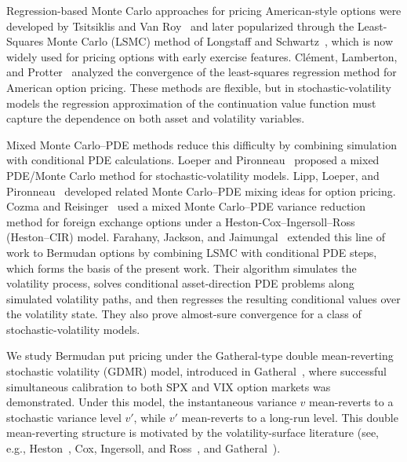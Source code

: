 \documentclass[pdflatex,sn-mathphys-num]{sn-jnl}
\theoremstyle{thmstyleone}%
\theoremstyle{thmstylethree}%
\theoremstyle{thmstyletwo}%
\begin{document}
Regression-based Monte Carlo approaches for pricing American-style options were developed by Tsitsiklis and Van Roy~\cite{tsitsiklis2001regression} and later popularized through the Least-Squares Monte Carlo (LSMC) method of Longstaff and Schwartz~\cite{longstaff2001valuing}, which is now widely used for pricing options with early exercise features.
Clément, Lamberton, and Protter~\cite{clement2002analysis} analyzed the
convergence of the least-squares regression method for American option pricing.
These methods are flexible, but in stochastic-volatility models the regression approximation of the continuation value function must capture the dependence on both asset and
volatility variables.

Mixed Monte Carlo--PDE methods reduce this difficulty by combining simulation
with conditional PDE calculations. Loeper and Pironneau~\cite{loeper2009mixed}
proposed a mixed PDE/Monte Carlo method for stochastic-volatility models.
Lipp, Loeper, and Pironneau~\cite{lipp2013mixing} developed related
Monte Carlo--PDE mixing ideas for option pricing. Cozma and
Reisinger~\cite{cozma2017mixed} used a mixed Monte Carlo--PDE variance
reduction method for foreign exchange options under a Heston-Cox--Ingersoll--Ross (Heston--CIR) model.
Farahany, Jackson, and Jaimungal~\cite{farahany2020mixing} extended this
line of work to Bermudan options by combining LSMC with conditional PDE
steps, which forms the basis of the present work. Their algorithm simulates the volatility process, solves conditional
asset-direction PDE problems along simulated volatility paths, and then
regresses the resulting conditional values over the volatility state. They also
prove almost-sure convergence for a class of stochastic-volatility models.

We study Bermudan put pricing under the Gatheral-type double mean-reverting stochastic volatility (GDMR) model, introduced in Gatheral~\cite{gatheral2008}, where successful simultaneous calibration to both SPX and VIX option markets was demonstrated. Under this model, the instantaneous variance $v$ mean-reverts to a stochastic variance level $v'$, while $v'$ mean-reverts to a long-run level. This double mean-reverting structure is motivated by the
volatility-surface literature (see, e.g., Heston~\cite{heston1993closedform}, Cox, Ingersoll,
and Ross~\cite{cir1985termstructure}, and Gatheral~\cite{gatheral2006volsurface}). 
\end{document}
